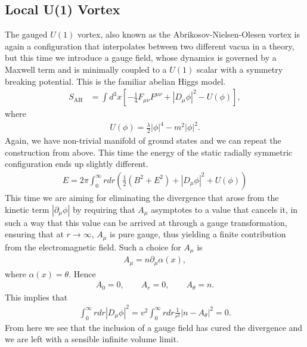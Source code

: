         \subsection{Local U(1) Vortex}
        The gauged $U(1)$ vortex, also known as the Abrikosov-Nielsen-Olesen vortex is again a configuration that interpolates between two different vacua in a theory, but this time we introduce a gauge field, whose dynamics is governed by a Maxwell term and is minimally coupled to a $U(1)$ scalar with a symmetry breaking potential. This is the familiar abelian Higgs model. 
        \begin{align}
            S_{\text{AH}} & = \int d^3x \left[-\frac{1}{4} F_{\mu \nu} F^{\mu \nu} + | D_{\mu} \phi|^2 - U(\phi) \right], \label{eq:Abelian_Higgs_Model}
        \end{align}
        where
        \begin{align}
            U(\phi) = \frac{\lambda}{2} |\phi|^4 - m^2 |\phi|^2.
        \end{align}
    Again, we have non-trivial manifold of ground states and we can repeat the construction from above. This time the energy of the static radially symmetric configuration ends up slightly different.
    \begin{align}
        E = 2 \pi \int_0^{\infty} r dr \left(\frac{1}{2}( B^2 + E^2) + |D_{\mu} \phi|^2 + U(\phi) \right)
    \end{align}
    This time we are aiming for eliminating the divergence that arose from the kinetic term $|\partial_{\mu}\phi|$ by requiring that $A_{\mu}$ asymptotes to a value that cancels it, in such a way that this value can be arrived at through a gauge transformation, ensuring that at $r\rightarrow \infty$, $A_{\mu}$ is pure gauge, thus yielding a finite contribution from the electromagnetic field. Such a choice for $A_{\mu}$ is
    \begin{align}
        A_{\mu} = n \partial_{\mu} \alpha(x),
    \end{align}
    where $\alpha(x) = \theta$. Hence
    \begin{align}
        A_0 =0, \qquad A_r =0, \qquad A_{\theta} = n.
    \end{align}
    This implies that
    \begin{align}
        \int_0^{\infty} r dr |D_{\mu}\phi|^2 = v^2\int_0^{\infty} r dr  \frac{1}{r^2}|n-A_{\theta}|^2 =0.
    \end{align}
    From here we see that the inclusion of a gauge field has cured the divergence and we are left with a sensible infinite volume limit. 

